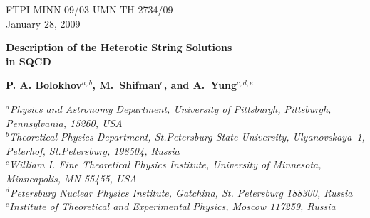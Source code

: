 \documentclass[12pt]{article}
\begin{document}
%
%



%
%

\begin{titlepage}

\begin{flushright}
FTPI-MINN-09/03 UMN-TH-2734/09\\
January 28, 2009
\end{flushright}

\begin{center}

{\Large \bf   Description of the Heterotic String Solutions
\\[2mm]
 in  SQCD }
\end{center}

\begin{center}
{\bf P. A. Bolokhov$^{a,b}$, M.~Shifman$^{c}$, and \bf A.~Yung$^{c,d,e}$}
\end {center}
\vspace{0.3cm}
\begin{center}

$^a${\it Physics and Astronomy Department, University of Pittsburgh, Pittsburgh, Pennsylvania, 15260, USA}\\
$^b${\it Theoretical Physics Department, St.Petersburg State University, Ulyanovskaya~1, 
	 Peterhof, St.Petersburg, 198504, Russia}\\
$^c${\it  William I. Fine Theoretical Physics Institute,
University of Minnesota,
Minneapolis, MN 55455, USA}\\
$^{d}${\it Petersburg Nuclear Physics Institute, Gatchina, St. Petersburg
188300, Russia}\\
$^e${\it Institute of Theoretical and Experimental Physics, Moscow
117259, Russia}
\end{center}

\begin{abstract}


\end{abstract}
\end{titlepage}
\end{document}
